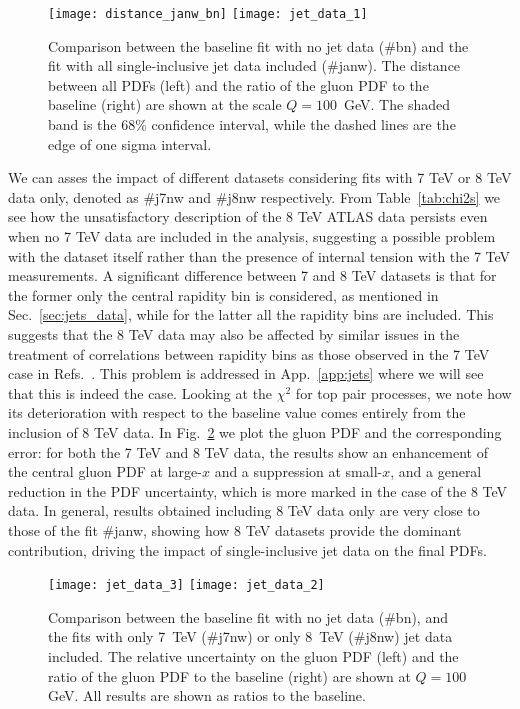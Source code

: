\begin{figure}[!t]
    \centering
    \texttt{[image: distance\_janw\_bn]}
    \texttt{[image: jet\_data\_1]}\\
    \caption{ Comparison between the baseline fit with no jet data  (\#bn)
      and the fit with all single-inclusive jet data included (\#janw).
      The distance between all PDFs
      (left) and the ratio of the gluon PDF to the baseline (right) are shown at the scale
      $Q=100$~GeV. The shaded band is the 68\% confidence interval,
      while the dashed lines are the edge of one sigma interval.}
    \label{fig:jet_data_total}
\end{figure}

%
We can asses the impact of different datasets considering fits with 7 TeV or 8 TeV data only, denoted as \#j7nw and \#j8nw
respectively. From Table~\ref{tab:chi2s} we see how the unsatisfactory description of the 8 TeV ATLAS data persists even when 
no 7 TeV data are included in the analysis, suggesting a possible problem with the dataset itself rather than 
the presence of internal tension with the 7 TeV measurements.
A significant difference between 7 and 8 TeV datasets is that for the former only the central rapidity bin is considered,
as mentioned in Sec.~\ref{sec:jets_data}, while for the latter all the rapidity bins are included.
This suggests that the 8 TeV data may also be affected by similar issues in the treatment of correlations 
between rapidity bins as those observed in the 7 TeV case in Refs.~\cite{Ball:2017nwa}. This problem is addressed
in App.~\ref{app:jets} where we will see that this is indeed the case.
%
Looking at the $\chi^2$ for top pair processes, we note how its deterioration with respect to the baseline value comes
entirely from the inclusion of 8 TeV data.
In Fig.~\ref{fig:jet_data_partial}
we plot the gluon PDF and the corresponding error: for both the 7 TeV and 8 TeV data, the results show 
an enhancement of the central gluon PDF at large-$x$ and a suppression at small-$x$, and a general reduction in the 
PDF uncertainty, which is more marked in the case of the 8 TeV data. 
In general, results obtained including 8 TeV data only are very close to those of the fit \#janw, showing
how 8 TeV datasets provide the dominant contribution, driving the impact of single-inclusive jet data on the final PDFs.

\begin{figure}[!t]
    \centering
    \texttt{[image: jet\_data\_3]}
    \texttt{[image: jet\_data\_2]}
    \caption{ Comparison between the baseline fit with no jet data
      (\#bn), and the fits with only 7~TeV (\#j7nw) or only 8~TeV (\#j8nw)
      jet data included. The relative uncertainty on the gluon PDF (left)
      and the ratio of the gluon PDF to the baseline (right) are shown at
      $Q=100$ GeV. All results are shown as ratios to the baseline.}
    \label{fig:jet_data_partial}
\end{figure}

